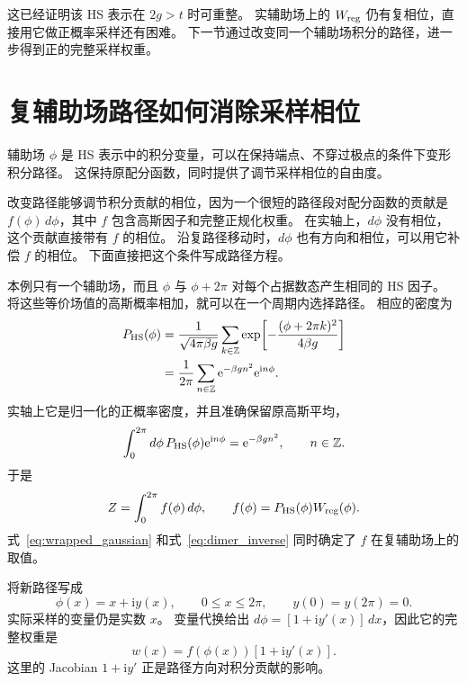 \documentclass[UTF8,11pt,a4paper,fontset=fandol]{ctexart}
\newcommand{\ee}{\mathrm e}
\newcommand{\ii}{\mathrm i}
\numberwithin{equation}{section}
\begin{document}
这已经证明该 HS 表示在 $2g>t$ 时可重整。
实辅助场上的 $W_{\rm reg}$ 仍有复相位，直接用它做正概率采样还有困难。
下一节通过改变同一个辅助场积分的路径，进一步得到正的完整采样权重。

\section{复辅助场路径如何消除采样相位}
\label{sec:positive_contour}

辅助场 $\phi$ 是 HS 表示中的积分变量，可以在保持端点、不穿过极点的条件下变形积分路径。
这保持原配分函数，同时提供了调节采样相位的自由度。

改变路径能够调节积分贡献的相位，因为一个很短的路径段对配分函数的贡献是 $f(\phi)\,d\phi$，其中 $f$ 包含高斯因子和完整正规化权重。
在实轴上，$d\phi$ 没有相位，这个贡献直接带有 $f$ 的相位。
沿复路径移动时，$d\phi$ 也有方向和相位，可以用它补偿 $f$ 的相位。
下面直接把这个条件写成路径方程。

本例只有一个辅助场，而且 $\phi$ 与 $\phi+2\pi$ 对每个占据数态产生相同的 HS 因子。
将这些等价场值的高斯概率相加，就可以在一个周期内选择路径。
相应的密度为
\begin{align}
 P_{\rm HS}(\phi)
 &=\frac1{\sqrt{4\pi\beta g}}\sum_{k\in\mathbb Z}
   \exp\!\left[-\frac{(\phi+2\pi k)^2}{4\beta g}\right]\nonumber\\
 &=\frac1{2\pi}\sum_{n\in\mathbb Z}
   \ee^{-\beta g n^2}\ee^{\ii n\phi}.
 \label{eq:wrapped_gaussian}
\end{align}
实轴上它是归一化的正概率密度，并且准确保留原高斯平均，
\begin{equation}
 \int_0^{2\pi}d\phi\,P_{\rm HS}(\phi)\ee^{\ii n\phi}
 =\ee^{-\beta g n^2},\qquad n\in\mathbb Z.
\end{equation}
于是
\begin{equation}
 Z=\int_0^{2\pi}f(\phi)\,d\phi,\qquad
 f(\phi)=P_{\rm HS}(\phi)W_{\rm reg}(\phi).
 \label{eq:contour_integrand}
\end{equation}
式~\eqref{eq:wrapped_gaussian} 和式~\eqref{eq:dimer_inverse} 同时确定了 $f$ 在复辅助场上的取值。

将新路径写成
\begin{equation}
 \phi(x)=x+\ii y(x),\qquad 0\le x\le2\pi,\qquad
 y(0)=y(2\pi)=0.
\end{equation}
实际采样的变量仍是实数 $x$。
变量代换给出 $d\phi=[1+\ii y'(x)]\,dx$，因此它的完整权重是
\begin{equation}
 w(x)=f(\phi(x))[1+\ii y'(x)].
\end{equation}
这里的 Jacobian $1+\ii y'$ 正是路径方向对积分贡献的影响。
\end{document}
